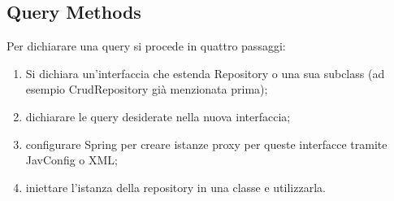 \subsection{Query Methods}
Per dichiarare una query si procede in quattro passaggi:
\begin{enumerate}
    \item Si dichiara un'interfaccia che estenda Repository o una sua subclass (ad esempio CrudRepository già menzionata prima);
    \item dichiarare le query desiderate nella nuova interfaccia;
    \item configurare Spring per creare istanze proxy per queste interfacce tramite JavConfig o XML;
    \item iniettare l'istanza della repository in una classe e utilizzarla.
\end{enumerate}